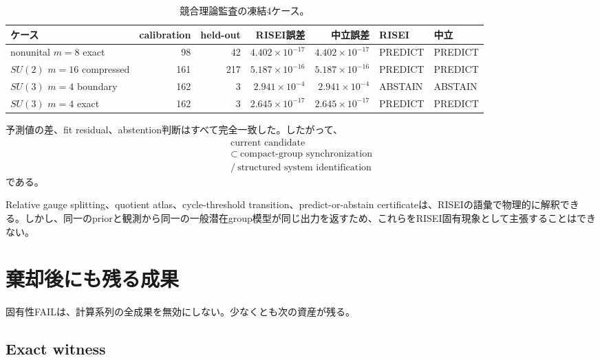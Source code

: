 \documentclass[11pt,a4paper,uplatex,dvipdfmx]{bxjsarticle}
\theoremstyle{remark}
\begin{document}
\begin{table}[htbp]
\centering
\caption{競合理論監査の凍結4ケース。}
\small
\setlength{\tabcolsep}{3pt}
\begin{tabularx}{\textwidth}{Xrrrrll}
\toprule
ケース & calibration & held-out & RISEI誤差 & 中立誤差 & RISEI & 中立 \\
\midrule
nonunital $m=8$ exact & 98 & 42 & $4.402\times10^{-17}$ & $4.402\times10^{-17}$ & PREDICT & PREDICT \\
$SU(2)$ $m=16$ compressed & 161 & 217 & $5.187\times10^{-16}$ & $5.187\times10^{-16}$ & PREDICT & PREDICT \\
$SU(3)$ $m=4$ boundary & 162 & 3 & $2.941\times10^{-4}$ & $2.941\times10^{-4}$ & ABSTAIN & ABSTAIN \\
$SU(3)$ $m=4$ exact & 162 & 3 & $2.645\times10^{-17}$ & $2.645\times10^{-17}$ & PREDICT & PREDICT \\
\bottomrule
\end{tabularx}
\end{table}

予測値の差、fit residual、abstention判断はすべて完全一致した。したがって、
\begin{equation}
\boxed{
\begin{gathered}
\text{current candidate}\\
\subset\ \text{compact-group synchronization}\\
/\ \text{structured system identification}
\end{gathered}}
\end{equation}
である。

\begin{warningbox}[固有性の決着]
Relative gauge splitting、quotient atlas、cycle-threshold transition、predict-or-abstain certificateは、RISEIの語彙で物理的に解釈できる。しかし、同一のpriorと観測から同一の一般潜在group模型が同じ出力を返すため、これらをRISEI固有現象として主張することはできない。
\end{warningbox}

\section{棄却後にも残る成果}

固有性FAILは、計算系列の全成果を無効にしない。少なくとも次の資産が残る。

\subsection{Exact witness}
\end{document}
